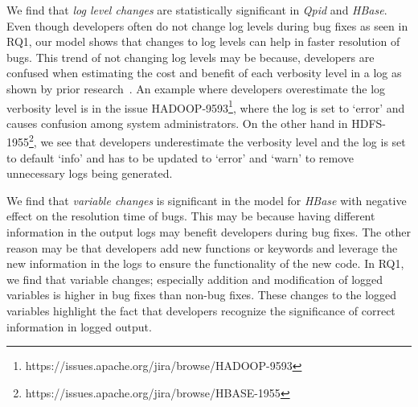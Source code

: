 We find that \textsl{log level changes} are statistically significant in \emph{Qpid} and \emph{HBase}. Even though developers often do not change log levels during bug fixes as seen in RQ1, our model shows that changes to log levels can help in faster resolution of bugs. This trend of not changing log levels may be because, developers are confused when estimating the cost and benefit of each verbosity level in a log as shown by prior research~\cite{Characterizinglogs}. An example where developers overestimate the log verbosity level is in the issue HADOOP-9593\footnote{https://issues.apache.org/jira/browse/HADOOP-9593}, where the log is set to `error' and causes confusion among system administrators. On the other hand in HDFS-1955\footnote{https://issues.apache.org/jira/browse/HBASE-1955}, we see that developers underestimate the verbosity level and the log is set to default `info' and has to be updated to `error' and `warn' to remove unnecessary logs being generated. 


We find that \textsl{variable changes} is significant in the model for \emph{HBase} with negative effect on the resolution time of bugs. This may be because having different information in the output logs may benefit developers during bug fixes. The other reason may be that developers add new functions or keywords and leverage the new information in the logs to ensure the functionality of the new code. In RQ1, we find that variable changes; especially addition and modification of logged variables is higher in bug fixes than non-bug fixes. These changes to the logged variables highlight the fact that developers recognize the significance of correct information in logged output. 


%	

